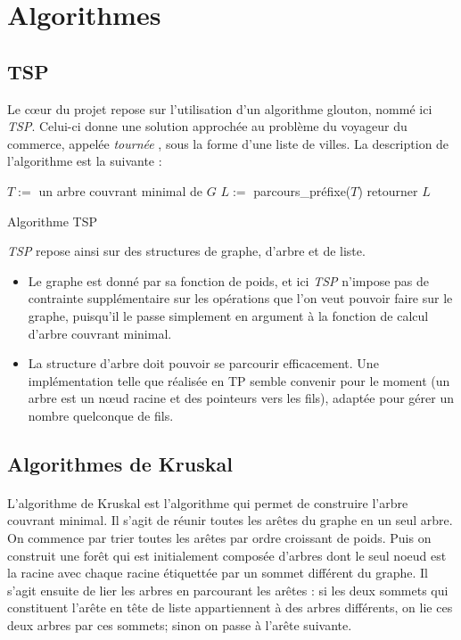 \documentclass[a4paper]{article}
\begin{document}
\bigskip

\section{Algorithmes}

\subsection{TSP}
Le cœur du projet repose sur l'utilisation d'un algorithme glouton, nommé ici \emph{TSP}. Celui-ci donne une solution approchée au problème du voyageur du commerce, appelée \textit{tournée} , sous la forme d'une liste de villes. La description de l'algorithme est la suivante :

\begin{algorithm}[H]
  \SetAlgoLined
  $T := $ un arbre couvrant minimal de $G$\;
  $L := $ parcours\_préfixe($T$)\;
  retourner $L$\;
  \caption{Algorithme TSP}
\end{algorithm}

\emph{TSP} repose ainsi sur des structures de graphe, d'arbre et de liste. \\
\begin{itemize}
\item Le graphe est donné par sa fonction de poids, et ici \emph{TSP} n'impose pas de contrainte supplémentaire sur les opérations que l'on veut pouvoir faire sur le graphe, puisqu'il le passe simplement en argument à la fonction de calcul d'arbre couvrant minimal.
\item La structure d'arbre doit pouvoir se parcourir efficacement. Une implémentation telle que réalisée en TP semble convenir pour le moment (un arbre est un nœud racine et des pointeurs vers les fils), adaptée pour gérer un nombre quelconque de fils.
\end{itemize}

\subsection{Algorithmes de Kruskal}

\paragraph*{} L'algorithme de Kruskal est l'algorithme qui permet de construire l'arbre couvrant minimal. Il s'agit de réunir toutes les arêtes du graphe en un seul arbre. On commence par trier toutes les arêtes par ordre croissant de poids. Puis on construit une forêt qui est initialement composée d'arbres dont le seul noeud est la racine avec chaque racine étiquettée par un sommet différent du graphe. Il s'agit ensuite de lier les arbres en parcourant les arêtes : si les deux sommets qui constituent l'arête en tête de liste appartiennent à des arbres différents, on lie ces deux arbres par ces sommets; sinon on passe à l'arête suivante.
\end{document}
